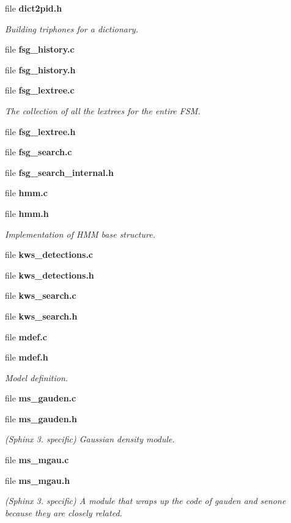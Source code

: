 \begin{DoxyCompactItemize}
file {\bf dict2pid.\-h}
\begin{DoxyCompactList}\small\item\em Building triphones for a dictionary. \end{DoxyCompactList}\item 
file {\bfseries fsg\-\_\-history.\-c}
\item 
file {\bfseries fsg\-\_\-history.\-h}
\item 
file {\bf fsg\-\_\-lextree.\-c}
\begin{DoxyCompactList}\small\item\em The collection of all the lextrees for the entire F\-S\-M. \end{DoxyCompactList}\item 
file {\bfseries fsg\-\_\-lextree.\-h}
\item 
file {\bfseries fsg\-\_\-search.\-c}
\item 
file {\bfseries fsg\-\_\-search\-\_\-internal.\-h}
\item 
file {\bfseries hmm.\-c}
\item 
file {\bf hmm.\-h}
\begin{DoxyCompactList}\small\item\em Implementation of H\-M\-M base structure. \end{DoxyCompactList}\item 
file {\bfseries kws\-\_\-detections.\-c}
\item 
file {\bfseries kws\-\_\-detections.\-h}
\item 
file {\bfseries kws\-\_\-search.\-c}
\item 
file {\bfseries kws\-\_\-search.\-h}
\item 
file {\bfseries mdef.\-c}
\item 
file {\bf mdef.\-h}
\begin{DoxyCompactList}\small\item\em Model definition. \end{DoxyCompactList}\item 
file {\bfseries ms\-\_\-gauden.\-c}
\item 
file {\bf ms\-\_\-gauden.\-h}
\begin{DoxyCompactList}\small\item\em (Sphinx 3. specific) Gaussian density module. \end{DoxyCompactList}\item 
file {\bfseries ms\-\_\-mgau.\-c}
\item 
file {\bf ms\-\_\-mgau.\-h}
\begin{DoxyCompactList}\small\item\em (Sphinx 3. specific) A module that wraps up the code of gauden and senone because they are closely related. \end{DoxyCompactList}\item 

\end{DoxyCompactItemize}
